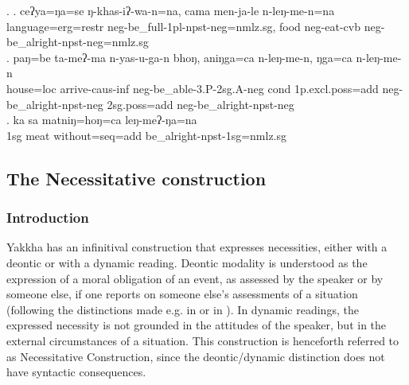 \ex. \ag. ceʔya=ŋa=se ŋ-khas-iʔ-wa-n=na, cama men-ja-le n-leŋ-me-n=na\\
		language{\sc =erg=restr} {\sc neg}-be\_full-{\sc 1pl-npst-neg=nmlz.sg}, food	 {\sc neg-}eat{\sc -cvb}	{\sc neg-}be\_alright{\sc [3sg]-npst-neg=nmlz.sg}	\\ 
\bg. paŋ=be     ta-meʔ-ma           n-yas-u-ga-n bhoŋ,  aniŋga=ca n-leŋ-me-n, ŋga=ca n-leŋ-me-n\\
	house{\sc =loc} arrive{\sc -caus-inf} {\sc neg-}be\_able-{\sc 3.P-2sg.A-neg} {\sc cond} {\sc 1p.excl.poss=add} {\sc neg}-be\_alright{\sc [3sg]-npst-neg} {\sc 2sg.poss=add} {\sc neg}-be\_alright{\sc [3sg]-npst-neg} 	\\
	 
	\bg. ka sa matniŋ=hoŋ=ca leŋ-meʔ-ŋa=na\\
{\sc 1sg} meat without{\sc =seq=add} be\_alright{\sc -npst-1sg=nmlz.sg}\\



\subsection{The Necessitative construction}\label{obl}

\subsubsection{Introduction}
Yakkha has an infinitival construction that expresses necessities, either with a deontic or with a dynamic reading. Deontic modality is understood as the expression of a moral obligation of an event, as assessed by the speaker or by someone else, if one reports on someone else's assessments of a situation (following the distinctions made e.g. in \citet[2]{Nuyts2006_Modality} or in \citealt[12]{Vanlinden2012_Modal}). In  dynamic readings, the expressed necessity is not grounded in the attitudes of the speaker, but in the external circumstances of a situation.  This construction is henceforth referred to as Necessitative Construction, since the deontic/dynamic distinction does not have syntactic consequences.

